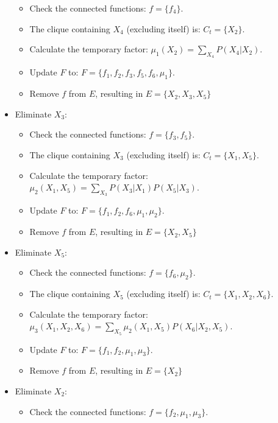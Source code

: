 \documentclass[12pt, a4paper]{report}
\begin{document}
\begin{example}
\begin{itemize}
\begin{itemize}
                    \item Check the connected functions: $f=\{f_4\}$. 
                    \item The clique containing $X_4$ (excluding itself) is: $C_t=\{X_2\}$. 
                    \item Calculate the temporary factor: $\mu_1(X_2)=\sum_{X_4}P(X_4|X_2)$. 
                    \item Update $F$ to: $F=\{f_1,f_2,f_3,f_5,f_6,\mu_1\}$. 
                    \item Remove $f$ from $E$, resulting in $E=\{X_2,X_3,X_5\}$
                \end{itemize}
            \item Eliminate $X_3$: 
                \begin{itemize}
                    \item Check the connected functions: $f=\{f_3,f_5\}$. 
                    \item The clique containing $X_3$ (excluding itself) is: $C_t=\{X_1,X_5\}$. 
                    \item Calculate the temporary factor: $\mu_2(X_1,X_5)=\sum_{X_3}P(X_3|X_1)P(X_5|X_3)$. 
                    \item Update $F$ to: $F=\{f_1,f_2,f_6,\mu_1,\mu_2\}$. 
                    \item Remove $f$ from $E$, resulting in $E=\{X_2,X_5\}$
                \end{itemize}
            \item Eliminate $X_5$: 
                \begin{itemize}
                    \item Check the connected functions: $f=\{f_6,\mu_2\}$. 
                    \item The clique containing $X_5$ (excluding itself) is: $C_t=\{X_1,X_2,X_6\}$. 
                    \item Calculate the temporary factor: $\mu_3(X_1,X_2,X_6)=\sum_{X_5}\mu_2(X_1,X_5)P(X_6|X_2,X_5)$. 
                    \item Update $F$ to: $F=\{f_1,f_2,\mu_1,\mu_3\}$. 
                    \item Remove $f$ from $E$, resulting in $E=\{X_2\}$
                \end{itemize}
            \item Eliminate $X_2$: 
                \begin{itemize}
                    \item Check the connected functions: $f=\{f_2,\mu_1,\mu_3\}$. 

\end{itemize}
\end{itemize}
\end{example}
\end{document}
